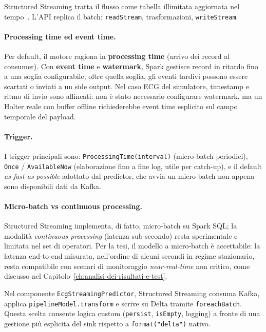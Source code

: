 Structured Streaming tratta il flusso come tabella illimitata aggiornata nel tempo~\cite{armbrust2018structured}.
L'API replica il batch: \texttt{readStream}, trasformazioni, \texttt{writeStream}.

\paragraph{Processing time ed event time.}
Per default, il motore ragiona in \textbf{processing time} (arrivo dei record al consumer).
Con \textbf{event time} e \textbf{watermark}, Spark gestisce record in ritardo fino a una soglia configurabile; oltre quella soglia, gli eventi tardivi possono essere scartati o inviati a un side output.
Nel caso ECG del simulatore, timestamp e ritmo di invio sono allineati: non è stato necessario configurare watermark, ma un Holter reale con buffer offline richiederebbe event time esplicito sul campo temporale del payload.

\paragraph{Trigger.}
I trigger principali sono: \texttt{ProcessingTime(interval)} (micro-batch periodici), \texttt{Once} / \texttt{AvailableNow} (elaborazione fino a fine log, utile per catch-up), e il default \emph{as fast as possible} adottato dal predictor, che avvia un micro-batch non appena sono disponibili dati da Kafka.

\paragraph{Micro-batch vs continuous processing.}
Structured Streaming implementa, di fatto, micro-batch su Spark SQL; la modalità \emph{continuous processing} (latenza sub-secondo) resta sperimentale e limitata nel set di operatori.
Per la tesi, il modello a micro-batch è accettabile: la latenza end-to-end misurata, nell'ordine di alcuni secondi in regime stazionario, resta compatibile con scenari di monitoraggio \emph{near-real-time} non critico, come discusso nel Capitolo~\ref{ch:analisi-dei-risultati-e-test}.

Nel componente \texttt{EcgStreamingPredictor}, Structured Streaming consuma Kafka, applica \texttt{pipelineModel.transform} e scrive su Delta tramite \texttt{foreachBatch}.
Questa scelta consente logica custom (\texttt{persist}, \texttt{isEmpty}, logging) a fronte di una gestione più esplicita del sink rispetto a \texttt{format("delta")} nativo.

